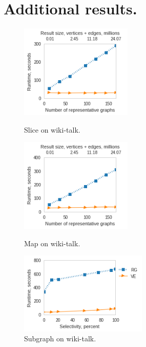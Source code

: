 \section{Additional results.}
\label{sec:app2}

\begin{figure}
\begin{minipage}[b]{2.2in}
\centering
\includegraphics[width=2.1in]{figs/slice_wikitalk_build13.png}
\caption{Slice on wiki-talk.}
\label{fig:slicewiki}
\end{minipage}
\begin{minipage}[b]{2.2in}
\centering
\includegraphics[width=2.1in]{figs/project_wikitalk_build13.png}
\caption{Map on wiki-talk.}
\label{fig:project}
\end{minipage}
\begin{minipage}[b]{2.2in}
\centering
\includegraphics[width=2.4in]{figs/subgraph_wikitalk_build13.png}
\caption{Subgraph on wiki-talk.}
\label{fig:subgraphwiki}
\end{minipage}
\end{figure}

